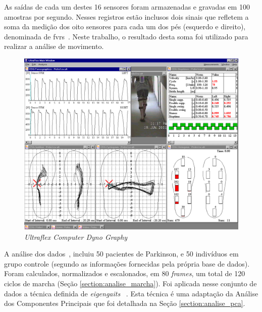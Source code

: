 As saídas de cada um destes 16 sensores foram armazenadas e gravadas em 100 amostras por segundo. Nesses registros estão inclusos dois sinais que refletem a soma da medição dos oito sensores para cada um dos pés (esquerdo e direito), denominada de \ac{fvrs}~\cite{gaitusingsensorsreview2012}. Neste trabalho, o resultado desta soma foi utilizado para realizar a análise de movimento.

\begin{figure}[!htbp]
 \centering
 \includegraphics[scale=0.4]{./img/ultraflexdinografia.png}
\caption{\textit{Ultraflex Computer Dyno Graphy}}
 \label{fig:dynography}
\end{figure}



A análise dos dados~\cite{physionet}, incluiu 50 pacientes de Parkinson, e 50 indivíduos em grupo controle (segundo as informações fornecidas pela própria base de dados). Foram calculados, normalizados e escalonados, em 80 \textit{frames}, um total de 120 ciclos de marcha (Seção \ref{section:analise_marcha}). Foi aplicada nesse conjunto de dados a técnica definida de \textit{eigengaits} ~\cite{medeiros2013}. Esta técnica é uma adaptação da Análise dos Componentes Principais que foi detalhada na Seção \ref{section:analise_pca}.



